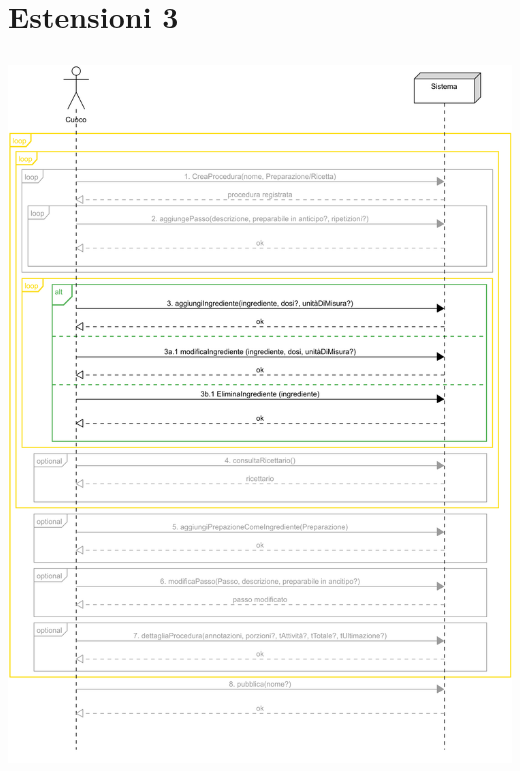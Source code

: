 \section*{Estensioni 3}
\includegraphics[max width=\textwidth, max height=190mm]{../resources/img/GRP/SSD/ext3.png}

